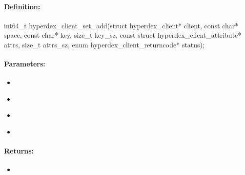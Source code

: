 \pagebreak
\subsection{}
\label{api:c:set_add}


\paragraph{Definition:}
\begin{ccode}
int64_t hyperdex_client_set_add(struct hyperdex_client* client,
        const char* space,
        const char* key, size_t key_sz,
        const struct hyperdex_client_attribute* attrs, size_t attrs_sz,
        enum hyperdex_client_returncode* status);
\end{ccode}

\paragraph{Parameters:}
\begin{itemize}[noitemsep]
\item {}\\

\item {}\\

\item {}\\

\item {}\\

\end{itemize}

\paragraph{Returns:}
\begin{itemize}[noitemsep]
\item {}\\

\end{itemize}

